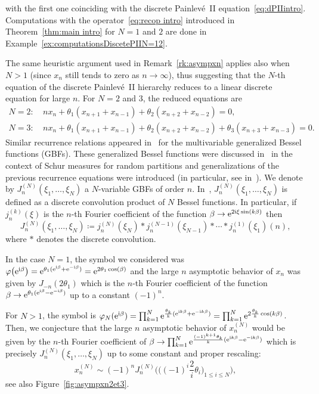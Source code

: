 \documentclass[pdftex]{sigma}%
\numberwithin{equation}{section}
\def\e{\mathrm{e}}
\begin{document}
with the first one coinciding with the discrete Painlev\'e~II equation~\eqref{eq:dPIIintro}. Computations with the operator~\eqref{eq:recop intro} introduced in Theorem~\ref{thm:main intro} for $N=1$ and $2$ are done in Example~\ref{ex:computationsDiscetePIIN=12}.
\begin{Remark} The same heuristic argument used in Remark~\ref{rk:asympxn} applies also when $N>1$ (since $x_n$ still tends to zero as $n\to\infty$), thus suggesting that the $N$-th equation of the discrete Painlev\'e~II hierarchy reduces to a linear discrete equation for large $n$. For $N=2$ and $3$, the reduced equations are
\begin{align*}
N=2\colon\	&n x_n+\theta_1(x_{n+1}+x_{n-1})+\theta_2(x_{n+2}+x_{n-2})=0,
\\
N=3\colon\	&n x_n+\theta_1(x_{n+1}+x_{n-1})+\theta_2(x_{n+2}+x_{n-2}) +\theta_3(x_{n+3}+x_{n-3})=0.
\end{align*}
Similar recurrence relations appeared
in~\cite{Dattoli92} for the multivariable generalized Bessel functions (GBFs). These generalized Bessel functions were discussed in~\cite{KimuraZahabi, Okunkov} in the context of Schur measures for random partitions and generalizations of the previous recurrence equations were introduced (in particular, see in~\cite[equation~(3.2b)]{KimuraZahabi}). We denote by $J_n^{(N)}(\xi_1,\dots,\xi_N)$ a $N$-variable GBFs of order $n$. In~\cite{Dattoli92}, $J_n^{(N)}(\xi_1,\dots,\xi_N)$ is defined as a discrete convolution product of $N$ Bessel functions. In particular, if $j_n^{(k)}(\xi)$ is the $n$-th Fourier coefficient of the function $\beta\to\e^{2{\rm i}\xi\sin(k\beta)}$ then
\begin{equation*}
J_n^{(N)}(\xi_1,\dots,\xi_N)\coloneqq j_n^{(N)}(\xi_N)\ast j_n^{(N-1)}(\xi_{N-1})\ast \cdots\ast j_n^{(1)}(\xi_1)(n),
\end{equation*}
where $\ast$ denotes the discrete convolution.

In the case $N=1$, the symbol we considered was $\varphi\big(\e^{{\rm i}\beta}\big)=\e^{\theta_1(\e^{{\rm i}\beta}+\e^{-{\rm i}\beta})}=\e^{2\theta_1\cos(\beta)}$ and the large $n$ asymptotic behavior of $x_n$ was given by $J_{-n}(2\theta_1)$ which is the $n$-th Fourier coefficient of the function $\beta\to \e^{\theta_1(\e^{{\rm i}\beta}-\e^{-{\rm i}\beta})}$ up to a constant $(-1)^n$.

For $N>1$, the symbol is $\varphi_N(\e^{{\rm i}\beta})=\prod_{k=1}^N\e^{\frac{\theta_k}{k}(\e^{{\rm i}k\beta}+\e^{-{\rm i}k\beta})}=\prod_{k=1}^N\e^{2\frac{\theta_k}{k}\cos(k\beta)}$. Then, we conjecture that the large $n$ asymptotic behavior of $x_n^{(N)}$ would be given by the $n$-th Fourier coefficient of $\beta\to \prod_{k=1}^N\e^{\frac{(-1)^{k+1}\theta_k}{k}(\e^{{\rm i}k\beta}-\e^{-{\rm i}k\beta})}$ which is precisely $J_n^{(N)}(\xi_1,\dots,\xi_N)$ up to some constant and proper rescaling:
\begin{equation*}
x_n^{(N)}\sim(-1)^nJ_n^{(N)}\bigg(\bigg((-1)^i\frac{2}{i}\theta_i\bigg)_{1\leqslant i\leqslant N}\bigg),
\end{equation*}
see also Figure~\ref{fig:asympxn2et3}.
\end{Remark}
\end{document}
